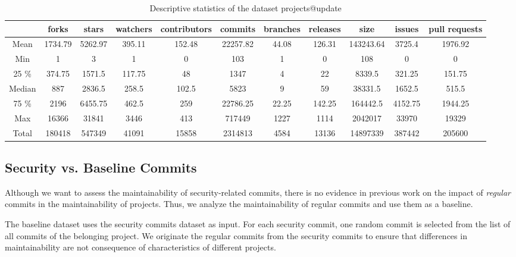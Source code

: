 \documentclass[10pt,conference]{IEEEtran}
\begin{document}
\begin{table}[h]
\centering
\caption{Descriptive statistics of the dataset projects\textcolor{mypink3}{@update}} \label{tab:dataset}
\begin{tabular}{@{}ccccccccccc@{}}
\toprule
     & forks   & stars   & watchers & contributors & commits  & branches & releases & size      & issues  & pull requests \\ \midrule
Mean & 1734.79 & 5262.97 & 395.11   & 152.48       & 22257.82 & 44.08    & 126.31   & 143243.64 & 3725.4  & 1976.92       \\
Min     & 1       & 3       & 1        & 0            & 103      & 1        & 0        & 108       & 0       & 0             \\
25 \%     & 374.75  & 1571.5  & 117.75   & 48           & 1347     & 4        & 22       & 8339.5    & 321.25  & 151.75        \\
Median     & 887     & 2836.5  & 258.5    & 102.5        & 5823     & 9        & 59       & 38331.5   & 1652.5  & 515.5         \\
75 \%     & 2196    & 6455.75 & 462.5    & 259          & 22786.25 & 22.25    & 142.25   & 164442.5  & 4152.75 & 1944.25       \\
Max     & 16366   & 31841   & 3446     & 413          & 717449   & 1227     & 1114     & 2042017   & 33970   & 19329         \\
Total     & 180418  & 547349  & 41091    & 15858        & 2314813  & 4584     & 13136    & 14897339  & 387442  & 205600        \\ \bottomrule
\end{tabular}
\end{table}


\subsection{Security vs. Baseline Commits}
%
Although we want to assess the maintainability of security-related commits,
\textcolor{mypink3}{there is no evidence in previous work on the impact of \textit{regular} commits
in the maintainability of projects}. Thus, we analyze the maintainability of
regular commits and use them as a baseline.

The baseline dataset uses the security commits dataset as input. For each
security commit, one random commit is selected from the list of all commits of
the belonging project. We originate the regular commits from the security
commits to ensure that differences in maintainability are not consequence of
characteristics of different projects.
%
\end{document}
